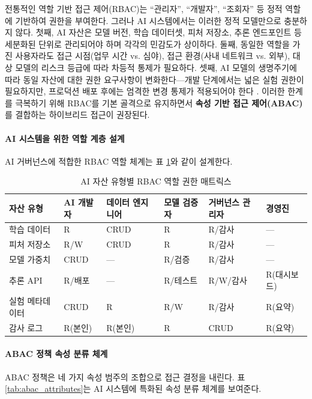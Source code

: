 전통적인 역할 기반 접근 제어(RBAC)는 ``관리자'', ``개발자'', ``조회자'' 등 정적 역할에 기반하여 권한을 부여한다. 그러나 AI 시스템에서는 이러한 정적 모델만으로 충분하지 않다. 첫째, AI 자산은 모델 버전, 학습 데이터셋, 피처 저장소, 추론 엔드포인트 등 세분화된 단위로 관리되어야 하며 각각의 민감도가 상이하다. 둘째, 동일한 역할을 가진 사용자라도 접근 시점(업무 시간 vs. 심야), 접근 환경(사내 네트워크 vs. 외부), 대상 모델의 리스크 등급에 따라 차등적 통제가 필요하다. 셋째, AI 모델의 생명주기에 따라 동일 자산에 대한 권한 요구사항이 변화한다---개발 단계에서는 넓은 실험 권한이 필요하지만, 프로덕션 배포 후에는 엄격한 변경 통제가 적용되어야 한다 \cite{sculley2015hidden}. 이러한 한계를 극복하기 위해 RBAC를 기본 골격으로 유지하면서 \textbf{속성 기반 접근 제어(ABAC)}를 결합하는 하이브리드 접근이 권장된다.

\paragraph{AI 시스템을 위한 역할 계층 설계}

AI 거버넌스에 적합한 RBAC 역할 체계는 표 \ref{tab:ai_rbac_roles}와 같이 설계한다.

\begin{table}[htbp]
\centering
\caption{AI 자산 유형별 RBAC 역할 권한 매트릭스}
\label{tab:ai_rbac_roles}
\begin{tabularx}{\textwidth}{p{2.2cm}XXXXX}
\toprule
\textbf{자산 유형} & \textbf{AI 개발자} & \textbf{데이터 엔지니어} & \textbf{모델 검증자} & \textbf{거버넌스 관리자} & \textbf{경영진} \\
\midrule
학습 데이터 & R & CRUD & R & R/감사 & --- \\
피처 저장소 & R/W & CRUD & R & R/감사 & --- \\
모델 가중치 & CRUD & --- & R/검증 & R/감사 & --- \\
추론 API & R/배포 & --- & R/테스트 & R/W/감사 & R(대시보드) \\
실험 메타데이터 & CRUD & R & R/W & R/감사 & R(요약) \\
감사 로그 & R(본인) & R(본인) & R & CRUD & R(요약) \\
\bottomrule
\end{tabularx}
\end{table}

\paragraph{ABAC 정책 속성 분류 체계}

ABAC 정책은 네 가지 속성 범주의 조합으로 접근 결정을 내린다. 표 \ref{tab:abac_attributes}는 AI 시스템에 특화된 속성 분류 체계를 보여준다.

